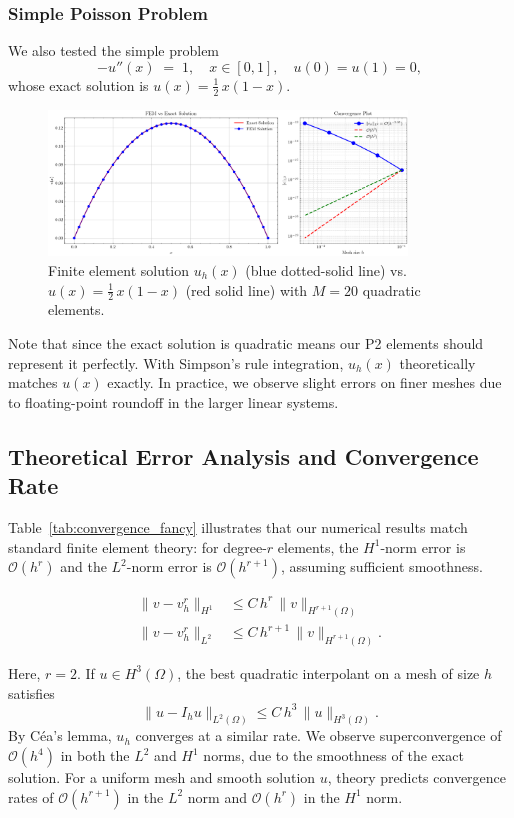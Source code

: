 \documentclass[a4paper,10pt]{article}
\begin{document}
\subsubsection*{Simple Poisson Problem}
We also tested the simple problem
\[
	-u''(x) \;=\; 1, \quad x \in [0,1], \quad u(0)=u(1)=0,
\]
whose exact solution is \(u(x) = \tfrac12\,x(1-x)\).

\begin{figure}[H]
	\centering
	\includegraphics[width=0.85\textwidth]{figures/fem_plot_convergence_simple_M20.png}
	\caption{Finite element solution \(u_h(x)\) (blue dotted-solid line) vs.\
		\(u(x)=\tfrac12\,x(1-x)\) (red solid line) with \(M=20\) quadratic elements.}
	\label{fig:solution_simple}
\end{figure}

\medskip

Note that since the exact solution is quadratic means our P2 elements should represent it perfectly.
With Simpson's rule integration, $u_h(x)$ theoretically matches $u(x)$ exactly.
In practice, we observe slight errors on finer meshes due to floating-point roundoff in the larger linear systems.

\subsection{Theoretical Error Analysis and Convergence Rate}
Table~\ref{tab:convergence_fancy} illustrates that our numerical results match
standard finite element theory: for degree-$r$ elements, the $H^1$-norm error is
$\mathcal{O}(h^r)$ and the $L^2$-norm error is $\mathcal{O}(h^{r+1})$, assuming
sufficient smoothness.

\begin{align*}
	\|v - v_h^r\|_{H^1} & \le C\,h^{r}\,\|v\|_{H^{r+1}(\Omega)}    \\
	\|v - v_h^r\|_{L^2} & \le C\,h^{r+1}\,\|v\|_{H^{r+1}(\Omega)}.
\end{align*}

Here, $r=2$. If $u \in H^3(\Omega)$, the best quadratic interpolant on a mesh
of size $h$ satisfies
\[
	\|u - I_h u\|_{L^2(\Omega)} \le C\,h^{3}\,\|u\|_{H^3(\Omega)}.
\]
By Céa's lemma, $u_h$ converges at a similar rate\cite{Curry2018}.
We observe superconvergence of $\mathcal{O}(h^4)$ in both the $L^2$ and $H^1$ norms, due to the smoothness of the exact solution.
For a uniform mesh and smooth solution $u$, theory predicts convergence rates of $\mathcal{O}(h^{r+1})$ in the $L^2$ norm and $\mathcal{O}(h^r)$ in the $H^1$ norm.
\end{document}
